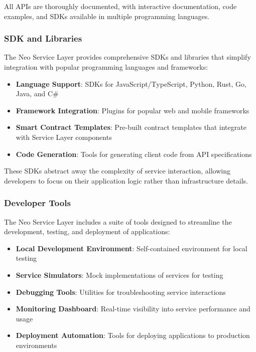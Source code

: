 All APIs are thoroughly documented, with interactive documentation, code examples, and SDKs available in multiple programming languages.

\subsubsection{SDK and Libraries}
\label{subsubsec:sdk-libraries}

The Neo Service Layer provides comprehensive SDKs and libraries that simplify integration with popular programming languages and frameworks:

\begin{itemize}
    \item \textbf{Language Support}: SDKs for JavaScript/TypeScript, Python, Rust, Go, Java, and C\#
    \item \textbf{Framework Integration}: Plugins for popular web and mobile frameworks
    \item \textbf{Smart Contract Templates}: Pre-built contract templates that integrate with Service Layer components
    \item \textbf{Code Generation}: Tools for generating client code from API specifications
\end{itemize}

These SDKs abstract away the complexity of service interaction, allowing developers to focus on their application logic rather than infrastructure details.

\subsubsection{Developer Tools}
\label{subsubsec:developer-tools}

The Neo Service Layer includes a suite of tools designed to streamline the development, testing, and deployment of applications:

\begin{itemize}
    \item \textbf{Local Development Environment}: Self-contained environment for local testing
    \item \textbf{Service Simulators}: Mock implementations of services for testing
    \item \textbf{Debugging Tools}: Utilities for troubleshooting service interactions
    \item \textbf{Monitoring Dashboard}: Real-time visibility into service performance and usage
    \item \textbf{Deployment Automation}: Tools for deploying applications to production environments
\end{itemize}

